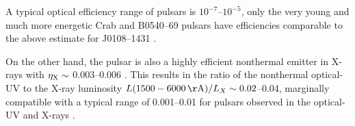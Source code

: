 \documentclass[pdftex,twocolumn]{aastex62}
\newcommand{\va}[1]{{\color[rgb]{1.0,0.0,0.0}VA: #1}}
\newcommand{\yus}[1]{{\color[rgb]{0.5,0.1,0.5}YS: #1}}
\newcommand{\gp}[1]{{\color{blue} #1}}
\begin{document}
  A typical optical efficiency range of pulsars is $10^{-7}$--$10^{-5}$, only the very young and much more 
  energetic Crab and B0540--69 pulsars have  efficiencies  comparable  to the 
  above estimate for J0108--1431 \citep{2006zhar,2010mpk,2015kir}.
  
  On the other hand, the pulsar is also a highly efficient nonthermal emitter in X-rays with 
  $\eta_{\rm X} \sim$ 0.003--0.006  \citep{Posselt2012}. %
  This results in the ratio of the nonthermal optical-UV to the X-ray luminosity 
  $L({\rm 1500-6000\,\AA})/L_{X} \sim 0.02$--0.04,
  marginally compatible with a typical range of 0.001--0.01 
  for pulsars observed 
  in the optical-UV and X-rays \citep{2004zp,2006zhar}. 
  
  
 
 
  
\end{document}
